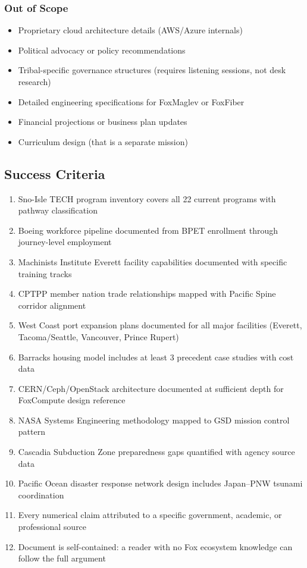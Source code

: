 \documentclass[11pt,letterpaper]{article}
\begin{document}
\subsubsection{Out of Scope}

\begin{itemize}[leftmargin=2em]
\item Proprietary cloud architecture details (AWS/Azure internals)
\item Political advocacy or policy recommendations
\item Tribal-specific governance structures (requires listening sessions, not desk research)
\item Detailed engineering specifications for FoxMaglev or FoxFiber
\item Financial projections or business plan updates
\item Curriculum design (that is a separate mission)
\end{itemize}

\subsection{Success Criteria}

\begin{enumerate}[leftmargin=2em]
\item Sno-Isle TECH program inventory covers all 22 current programs with pathway classification
\item Boeing workforce pipeline documented from BPET enrollment through journey-level employment
\item Machinists Institute Everett facility capabilities documented with specific training tracks
\item CPTPP member nation trade relationships mapped with Pacific Spine corridor alignment
\item West Coast port expansion plans documented for all major facilities (Everett, Tacoma/Seattle, Vancouver, Prince Rupert)
\item Barracks housing model includes at least 3 precedent case studies with cost data
\item CERN/Ceph/OpenStack architecture documented at sufficient depth for FoxCompute design reference
\item NASA Systems Engineering methodology mapped to GSD mission control pattern
\item Cascadia Subduction Zone preparedness gaps quantified with agency source data
\item Pacific Ocean disaster response network design includes Japan--PNW tsunami coordination
\item Every numerical claim attributed to a specific government, academic, or professional source
\item Document is self-contained: a reader with no Fox ecosystem knowledge can follow the full argument
\end{enumerate}
\end{document}
